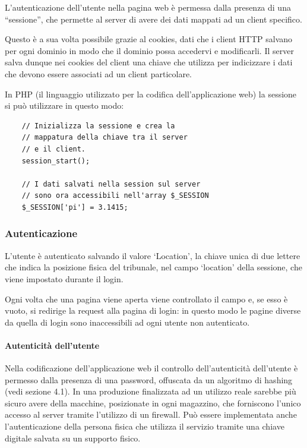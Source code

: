 \documentclass{article}
\begin{document}
L'autenticazione dell'utente nella pagina web è permessa dalla presenza di una ``sessione'', che permette al server di avere dei dati mappati ad un client specifico.

Questo è a sua volta possibile grazie al cookies, dati che i client HTTP salvano per ogni dominio in modo che il dominio possa accedervi e modificarli. Il server salva dunque nei cookies del client una chiave che utilizza per indicizzare i dati che devono essere associati ad un client particolare.

In PHP (il linguaggio utilizzato per la codifica dell'applicazione web) la sessione si può utilizzare in questo modo:
\lstset{language=php}
\begin{lstlisting}
    // Inizializza la sessione e crea la
    // mappatura della chiave tra il server
    // e il client.
    session_start();

    // I dati salvati nella session sul server
    // sono ora accessibili nell'array $_SESSION
    $_SESSION['pi'] = 3.1415;
\end{lstlisting}

\subsubsection{Autenticazione}

L'utente è autenticato salvando il valore `Location', la chiave unica di due lettere che indica la posizione fisica del tribunale, nel campo `location' della sessione, che viene impostato durante il login.

Ogni volta che una pagina viene aperta viene controllato il campo e, se esso è vuoto, si redirige la request alla pagina di login: in questo modo le pagine diverse da quella di login sono inaccessibili ad ogni utente non autenticato.

\paragraph{Autenticità dell'utente}
Nella codificazione dell'applicazione web il controllo dell'autenticità dell'utente è permesso dalla presenza di una password, offuscata da un algoritmo di hashing (vedi sezione 4.1). In una produzione finalizzata ad un utilizzo reale sarebbe più sicuro avere della macchine, posizionate in ogni magazzino, che forniscono l'unico accesso al server tramite l'utilizzo di un firewall. Può essere implementata anche l'autenticazione della persona fisica che utilizza il servizio tramite una chiave digitale salvata su un supporto fisico.
\end{document}
